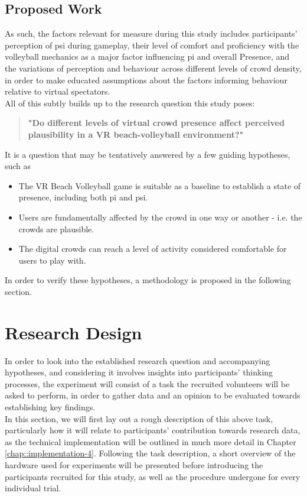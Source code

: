 \subsection{Proposed Work}

As such, the factors relevant for measure during this study includes participants' perception of \gls{psi} during gameplay, their level of comfort and proficiency with the volleyball mechanics as a major factor influencing \gls{pi} and overall Presence, and the variations of perception and behaviour across different levels of crowd density, in order to make educated assumptions about the factors informing behaviour relative to virtual spectators.\\

\noindent All of this subtly builds up to the research question this study poses:

\begin{quote}
	\textbf{"Do different levels of virtual crowd presence affect perceived plausibility in a VR beach-volleyball environment?"}
\end{quote}

\noindent It is a question that may be tentatively answered by a few guiding hypotheses, such as 

\begin{itemize}
	\item The VR Beach Volleyball game is suitable as a baseline to establish a state of presence, including both \gls{pi} and \gls{psi}.
	\item Users are fundamentally affected by the crowd in one way or another - i.e. the crowds are plausible.
	\item The digital crowds can reach a level of activity considered comfortable for users to play with.
\end{itemize}

In order to verify these hypotheses, a methodology is proposed in the following section.

\section{Research Design}
\label{sec::methodology}

In order to look into the established research question and accompanying hypotheses, and considering it involves insights into participants' thinking processes, the experiment will consist of a task the recruited volunteers will be asked to perform, in order to gather data and an opinion to be evaluated towards establishing key findings.\\
In this section, we will first lay out a rough description of this above task, particularly how it will relate to participants' contribution towards research data, as the technical implementation will be outlined in much more detail in Chapter \ref{chap::implementation-4}. Following the task description, a short overview of the hardware used for experiments will be presented before introducing the participants recruited for this study, as well as the procedure undergone for every individual trial.

